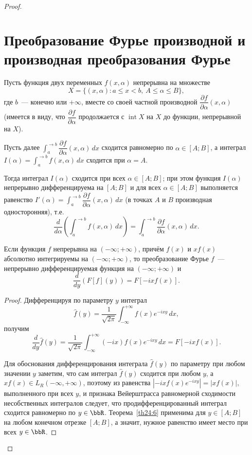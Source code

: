 \begin{proof}
\section{Преобразование Фурье производной и производная преобразования Фурье}

\begin{thm}
\label{th24:6}
Пусть функция двух переменных $f(x, \alpha)$ непрерывна на множестве
$$
X = \{(x, \alpha) : a \le x < b,\ A \le \alpha \le B\},
$$
где $b$~--- конечно или $+\infty$, вместе со своей частной производной $\dfrac{\partial f}{\partial \alpha}(x, \alpha)$ (имеется в виду, что $\dfrac{\partial f}{\partial \alpha}$ продолжается с $\operatorname{int} X$ на $X$ до функции, непрерывной на $X$).

Пусть далее $\int_a^{\to b} \dfrac{\partial f}{\partial \alpha}(x, \alpha)\,dx$ сходится равномерно по $\alpha \in [A;B]$, а интеграл $I(\alpha) = \int_a^{\to b} f(x, \alpha)\,dx$ сходится при $\alpha = A$.

Тогда интеграл $I(\alpha)$ сходится при всех $\alpha \in [A;B]$; при этом функция $I(\alpha)$ непрерывно дифференцируема на $[A;B]$ и для всех $\alpha \in [A;B]$ выполняется равенство $I'(\alpha) = \int_a^{\to b} \dfrac{\partial f}{\partial \alpha}(x, \alpha)\,dx$ (в точках $A$ и $B$ производная односторонняя), т.е.
$$
\frac{d}{d\alpha}\left(\int_a^{\to b} f(x, \alpha)\,dx\right) = \int_a^{\to b} \frac{\partial f}{\partial \alpha}(x, \alpha)\,dx.
$$
\end{thm}


\begin{thm}
\label{th25:5}
Если функция $f$ непрерывна на $(-\infty; +\infty)$, причём $f(x)$ и $xf(x)$ абсолютно интегрируемы на $(-\infty; +\infty)$, то преобразование Фурье $f$~--- непрерывно дифференцируемая функция на $(-\infty; +\infty)$ и
$$
\frac{d}{dy}(F[f](y)) = F[-ixf(x)].
$$
\end{thm}

\begin{proof}
Дифференцируя по параметру $y$ интеграл
$$
\widehat{f}(y) = \frac{1}{\sqrt{2\pi}}\int_{-\infty}^{+\infty} f(x)e^{-ixy}\,dx,
$$
получим
$$
\frac{d}{dy}\widehat{f}(y) = \frac{1}{\sqrt{2\pi}}\int_{-\infty}^{+\infty} (-ix)f(x)e^{-ixy}\,dx = F[-ixf(x)].
$$

Для обоснования дифференцирования интеграла $\widehat{f}(y)$ по параметру при любом значении $y$ заметим, что сам интеграл $\widehat{f}(y)$ сходится при любом $y$, а $xf(x) \in L_R(-\infty, +\infty)$, поэтому из равенства $|-ixf(x)e^{-ixy}| = |xf(x)|$, выполненного при всех $y$, и признака Вейерштрасса равномерной сходимости несобственных интегралов следует, что продифференцированный интеграл сходится равномерно по $y \in \bbR$. Теорема~\ref{th24:6} применима для $y \in [A;B]$ на любом конечном отрезке $[A;B]$, а значит, нужное равенство имеет место при всех $y \in \bbR$.
\end{proof}


\end{proof}
